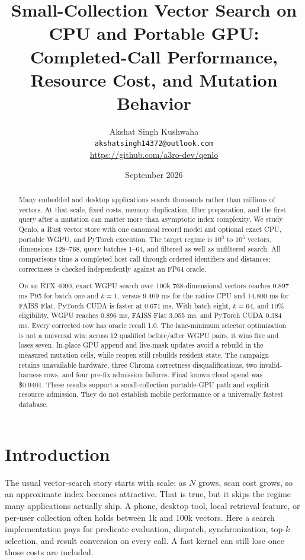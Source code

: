 \documentclass[10pt]{article}
\title{Small-Collection Vector Search on CPU and Portable GPU:\\Completed-Call Performance, Resource Cost, and Mutation Behavior}
\author{Akshat Singh Kushwaha\\
\texttt{akshatsingh14372@outlook.com}\\
\url{https://github.com/a3ro-dev/qenlo}}
\date{September 2026}
\newcommand{\qenlo}{Qenlo}
\newcommand{\N}{N}
\begin{document}
\maketitle

\begin{abstract}
Many embedded and desktop applications search thousands rather than millions of vectors. At that scale, fixed costs, memory duplication, filter preparation, and the first query after a mutation can matter more than asymptotic index complexity. We study \qenlo{}, a Rust vector store with one canonical record model and optional exact CPU, portable WGPU, and PyTorch execution. The target regime is \(10^3\) to \(10^5\) vectors, dimensions 128--768, query batches 1--64, and filtered as well as unfiltered search. All comparisons time a completed host call through ordered identifiers and distances; correctness is checked independently against an FP64 oracle.

On an RTX 4090, exact WGPU search over 100k 768-dimensional vectors reaches 0.897 ms P95 for batch one and \(k=1\), versus 9.409 ms for the native CPU and 14.800 ms for FAISS Flat. PyTorch CUDA is faster at 0.671 ms. With batch eight, \(k=64\), and 10\% eligibility, WGPU reaches 0.896 ms, FAISS Flat 3.055 ms, and PyTorch CUDA 0.384 ms. Every corrected row has oracle recall 1.0. The lane-minimum selector optimization is not a universal win: across 12 qualified before/after WGPU pairs, it wins five and loses seven. In-place GPU append and live-mask updates avoid a rebuild in the measured mutation cells, while reopen still rebuilds resident state. The campaign retains unavailable hardware, three Chroma correctness disqualifications, two invalid-harness rows, and four pre-fix admission failures. Final known cloud spend was \$0.9401. These results support a small-collection portable-GPU path and explicit resource admission. They do not establish mobile performance or a universally fastest database.
\end{abstract}

\section{Introduction}
The usual vector-search story starts with scale: as \(\N\) grows, scan cost grows, so an approximate index becomes attractive. That is true, but it skips the regime many applications actually ship. A phone, desktop tool, local retrieval feature, or per-user collection often holds between 1k and 100k vectors. Here a search implementation pays for predicate evaluation, dispatch, synchronization, top-\(k\) selection, and result conversion on every call. A fast kernel can still lose once those costs are included.
\end{document}
